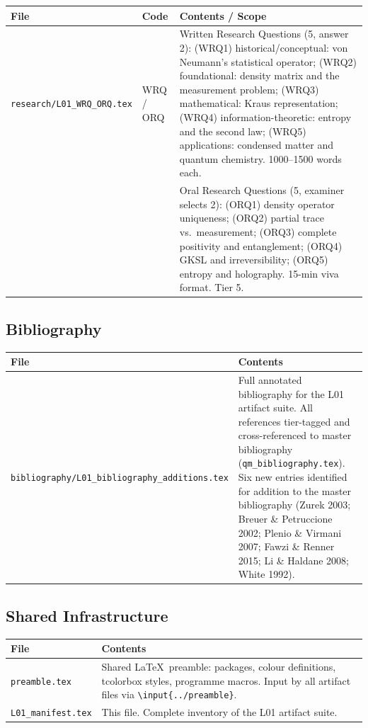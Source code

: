 \documentclass[11pt,a4paper]{article}
\begin{document}
\begin{tabularx}{\textwidth}{llX}
\toprule
\textbf{File} & \textbf{Code} & \textbf{Contents / Scope}\\
\midrule
\texttt{research/L01\_WRQ\_ORQ.tex}
& WRQ / ORQ
& Written Research Questions (5, answer 2): (WRQ1) historical/conceptual:
  von Neumann's statistical operator; (WRQ2) foundational: density matrix
  and the measurement problem; (WRQ3) mathematical: Kraus representation;
  (WRQ4) information-theoretic: entropy and the second law;
  (WRQ5) applications: condensed matter and quantum chemistry.
  1000--1500 words each.\\
  & & Oral Research Questions (5, examiner selects 2): (ORQ1) density operator
  uniqueness; (ORQ2) partial trace vs.\ measurement; (ORQ3) complete positivity
  and entanglement; (ORQ4) GKSL and irreversibility; (ORQ5) entropy and holography.
  15-min viva format. Tier 5.\\
\bottomrule
\end{tabularx}

\subsection*{Bibliography}

\begin{tabularx}{\textwidth}{lX}
\toprule
\textbf{File} & \textbf{Contents}\\
\midrule
\texttt{bibliography/L01\_bibliography\_additions.tex}
& Full annotated bibliography for the L01 artifact suite.
  All references tier-tagged and cross-referenced to master bibliography
  (\texttt{qm\_bibliography.tex}). Six new entries identified for addition
  to the master bibliography (Zurek 2003; Breuer \& Petruccione 2002;
  Plenio \& Virmani 2007; Fawzi \& Renner 2015; Li \& Haldane 2008;
  White 1992).\\
\bottomrule
\end{tabularx}

\subsection*{Shared Infrastructure}

\begin{tabularx}{\textwidth}{lX}
\toprule
\textbf{File} & \textbf{Contents}\\
\midrule
\texttt{preamble.tex}
& Shared \LaTeX\ preamble: packages, colour definitions,
  tcolorbox styles, programme macros.
  Input by all artifact files via \texttt{\textbackslash input\{../preamble\}}.\\
\texttt{L01\_manifest.tex}
& This file. Complete inventory of the L01 artifact suite.\\
\bottomrule
\end{tabularx}
\end{document}

